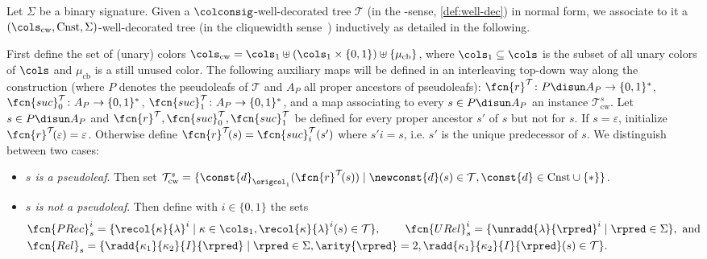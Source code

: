 \begin{definition}\label{def:hcwtocw-bin}
	Let $\Sigma$ be a binary signature. Given a $\colconsig$-well-decorated tree $\mathcal{T}$ (in the \partitionwidth{}-sense, \cref{def:well-dec}) in normal form, we associate to it a $(\cols_{\mathrm{cw}}, \mathrm{Cnst}, \Sigma)$-well-decorated tree (in the cliquewidth sense~\cite[Definition 6]{ICDT2023}) inductively as detailed in the following.
	
	First define the set of (unary) colors $\cols_{\mathrm{cw}} = \cols_1 \uplus (\cols_1 \times \{ 0,1 \}) \uplus \{ \mu_{\mathrm{cb}}\}$, where $\cols_1\subseteq\cols$ is the subset of all unary colors of $\cols$ and $\mu_{\mathrm{cb}}$ is a still unused color.
	The following auxiliary maps will be defined in an interleaving top-down way along the construction (where $P$ denotes the pseudoleafs of $\mathcal{T}$ and $A_P$ all proper ancestors of pseudoleafs):  $\fcn{r}^{\mathcal{T}}\colon P\disun A_{P} \to \{ 0,1 \}^*$, $\fcn{suc}^{\mathcal{T}}_0\colon A_{P} \to \{ 0,1 \}^*$, $\fcn{suc}^{\mathcal{T}}_1\colon A_{P} \to \{ 0,1 \}^*$, and a map associating to every $s\in P\disun A_P$ an instance $\mathcal{T}_{\mathrm{cw}}^{s}$.
	Let $s\in P\disun A_{P}$ and $\fcn{r}^{\mathcal{T}}, \fcn{suc}^{\mathcal{T}}_0, \fcn{suc}^{\mathcal{T}}_1$ be defined for every proper ancestor $s'$ of $s$ but not for $s$. 
	If $s = \varepsilon$, initialize $\fcn{r}^{\mathcal{T}}\!(\varepsilon) = \varepsilon$. Otherwise define $\fcn{r}^{\mathcal{T}}\!(s) = \fcn{suc}_{i}^{\mathcal{T}}(s')$ where $s'i = s$, i.e. $s'$ is the unique predecessor of $s$.
	We distinguish between two cases:
	\begin{itemize}
		\item \emph{$s$ is a pseudoleaf}. Then set $\mathcal{T}_{\mathrm{cw}}^{s} = \{ \const{d}_{\origcol_1}(\fcn{r}^{\mathcal{T}}\!(s)) \mid \newconst{d}(s)\in\mathcal{T}, \const{d} \in \mathrm{Cnst} \cup \{\ast\} \}$.
		\item \emph{$s$ is not a pseudoleaf}. Then define with $i\in\{ 0,1 \}$ the sets
		\begin{align*}
			&\fcn{PRec}^{i}_{s} = \{ \recol{\kappa}{\lambda}^{i} \mid \kappa\in\cols_1,  \recol{\kappa}{\lambda}^{i}(s)\in\mathcal{T} \},  \hspace{5ex}\fcn{URel}^{i}_{s} = \{ \unradd{\lambda}{\rpred}^{i} \mid \rpred\in\Sigma \}, \text{ and} \\
			&\fcn{Rel}_{s} = \{ \radd{\kappa_1}{\kappa_2}{I}{\rpred} \mid \rpred\in\Sigma, \arity{\rpred} = 2,  \radd{\kappa_1}{\kappa_2}{I}{\rpred}(s)\in\mathcal{T}  \}.

\end{align*}
\end{itemize}
\end{definition}
